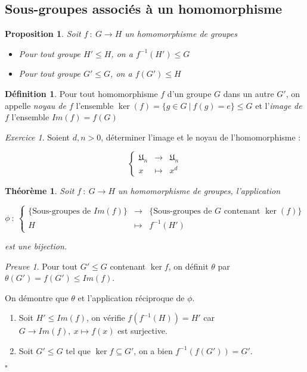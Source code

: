 \documentclass[]{article}
\newtheorem{mythm}{Théorème}
\newtheorem{myproposition}{Proposition}
\theoremstyle{remark}
\newtheorem{myexer}{Exercice}
\newtheorem{myproof}{Preuve}
\theoremstyle{definition}
\newtheorem{mydef}{Définition}
\newcommand{\cqfd}{
	\hfill$\square$
}
\newcommand{\funcshort}[3]{
#1 ~ : ~ #2 \longrightarrow #3
}
\begin{document}
\subsection{Sous-groupes associés à un homomorphisme}

\begin{myproposition}
	Soit $\funcshort{f}{G}{H}$ un homomorphisme de groupes
	\begin{itemize}
		\item Pour tout groupe $H' \leqslant H$, on a $f^{-1}(H') \leqslant G$
		
		\item Pour tout groupe $G' \leqslant G$, on a $f(G') \leqslant H$
	\end{itemize}
\end{myproposition}

\begin{mydef}
	Pour tout homomorphisme $f$ d'un groupe $G$ dans un autre $G'$, on appelle \textit{noyau de $f$} l'ensemble $\ker(f)=\{g \in G ~ | ~ f(g) = e\} \leqslant G$ et l'\textit{image de $f$} l'ensemble $Im(f)=f(G)$
\end{mydef}

\begin{myexer}
	Soient $d, n > 0$, déterminer l'image et le noyau de l'homomorphisme :
	
	$$\left\{
		\begin{array}{ccc}
			\mathfrak{U}_n & \longrightarrow & \mathfrak{U}_n \\
			x & \longmapsto & x^d
		\end{array}
	\right.$$
\end{myexer}

\begin{mythm}
	Soit $\funcshort{f}{G}{H}$ un homomorphisme de groupes, l'application
	
	$$\phi ~ : ~ \left\{\begin{array}{rcl}
		\{\text{Sous-groupes de } Im(f)\} & \longrightarrow & \{\text{Sous-groupes de } G \text{ contenant }\ker(f)\} \\
		H & \longmapsto & f^{-1}(H')
	\end{array}\right.$$
	
	est une bijection.
\end{mythm}

\begin{myproof}
	Pour tout $G' \leqslant G$ contenant $\ker f$, on définit $\theta$ par $\theta(G')=f(G') \leqslant Im(f)$.
	
	On démontre que $\theta$ et l'application réciproque de $\phi$.
	
	\begin{enumerate}
		\item Soit $H' \leqslant Im(f)$, on vérifie $f(f^{-1}(H))=H'$ car $G \longrightarrow Im(f), ~ x \longmapsto f(x)$ est surjective.
		
		\item Soit $G' \leqslant G$ tel que $\ker f \subseteq G'$, on a bien $f^{-1}(f(G'))=G'$.
	\end{enumerate}
	
	\cqfd
\end{myproof}
\end{document}
